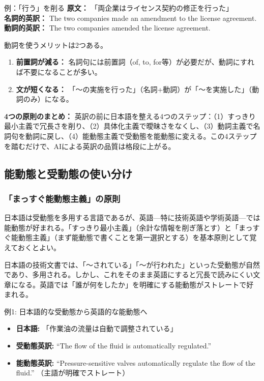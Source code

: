\begin{itembox}[l]{例：「行う」を削る}
\textbf{原文：} 「両企業はライセンス契約の修正を行った」\\
\textbf{名詞的英訳：} The two companies made an amendment to the license agreement.\\
\textbf{動詞的英訳：} The two companies amended the license agreement.
\end{itembox}

動詞を使うメリットは2つある。
\begin{enumerate}
\item \textbf{前置詞が減る：} 名詞句には前置詞（of, to, for等）が必要だが、動詞にすれば不要になることが多い。
\item \textbf{文が短くなる：} 「〜の実施を行った」（名詞+動詞）が「〜を実施した」（動詞のみ）になる。
\end{enumerate}

\begin{screen}
\textbf{4つの原則のまとめ：} 英訳の前に日本語を整える4つのステップ：（1）すっきり最小主義で冗長さを削り、（2）具体化主義で曖昧さをなくし、（3）動詞主義で名詞句を動詞に戻し、（4）能動態主義で受動態を能動態に変える。この4ステップを踏むだけで、AIによる英訳の品質は格段に上がる。
\end{screen}

\subsection{能動態と受動態の使い分け}
\label{subsec:voice}

\subsubsection{「まっすぐ能動態主義」の原則}

日本語は受動態を多用する言語であるが、英語---特に技術英語や学術英語---では能動態が好まれる。「すっきり最小主義」（余計な情報を削ぎ落とす）と「まっすぐ能動態主義」（まず能動態で書くことを第一選択とする）を基本原則として覚えておくとよい。

日本語の技術文書では、「〜されている」「〜が行われた」といった受動態が自然であり、多用される。しかし、これをそのまま英語にすると冗長で読みにくい文章になる。英語では「誰が何をしたか」を明確にする能動態がストレートで好まれる。

\begin{itembox}[l]{例1: 日本語的な受動態から英語的な能動態へ}
\begin{itemize}
\item \textbf{日本語:} 「作業油の流量は自動で調整されている」
\item \textbf{受動態英訳:} ``The flow of the fluid is automatically regulated.''
\item \textbf{能動態英訳:} ``Pressure-sensitive valves automatically regulate the flow of the fluid.'' （主語が明確でストレート）
\end{itemize}
\end{itembox}

